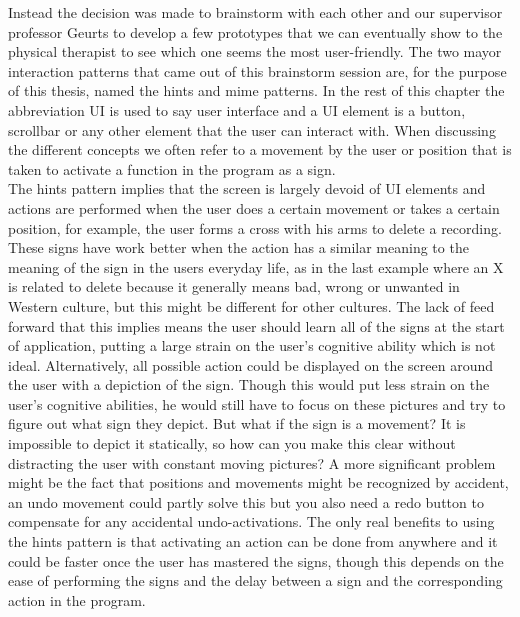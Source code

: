 
Instead the decision was made to brainstorm with each other and our supervisor professor Geurts to develop a few prototypes that we can eventually show to the physical therapist to see which one seems the most user-friendly. The two mayor interaction patterns that came out of this brainstorm session are, for the purpose of this thesis, named the hints and mime patterns. In the rest of this chapter the abbreviation UI is used to say user interface and a UI element is a button, scrollbar or any other element that the user can interact with. When discussing the different concepts we often refer to a movement by the user or position that is taken to activate a function in the program as a sign.\\

The hints pattern implies that the screen is largely devoid of UI elements and actions are performed when the user does a certain movement or takes a certain position, for example, the user forms a cross with his arms to delete a recording. These signs have work better when the action has a similar meaning to the meaning of the sign in the users everyday life, as in the last example where an X is related to delete because it generally means bad, wrong or unwanted in Western culture, but this might be different for other cultures. The lack of feed forward that this implies means the user should learn all of the signs at the start of application, putting a large strain on the user's cognitive ability which is not ideal. Alternatively, all possible action could be displayed on the screen around the user with a depiction of the sign. Though this would put less strain on the user's cognitive abilities, he would still have to focus on these pictures and try to figure out what sign they depict. But what if the sign is a movement? It is impossible to depict it statically, so how can you make this clear without distracting the user with constant moving pictures? A more significant problem might be the fact that positions and movements might be recognized by accident, an undo movement could partly solve this but you also need a redo button to compensate for any accidental undo-activations. The only real benefits to using the hints pattern is that activating an action can be done from anywhere and it could be faster once the user has mastered the signs, though this depends on the ease of performing the signs and the delay between a sign and the corresponding action in the program.\\

